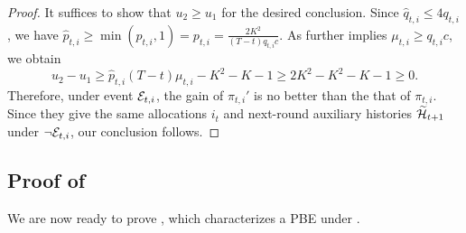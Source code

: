 \begin{proof}
It suffices to show that $u_2\geq u_1$ for the desired conclusion.
Since $\hat q_{t,i}\leq 4q_{t,i}$, we have $\hat p_{t,i} \geq \min(p_{t,i},1)=p_{t,i}=\frac{2K^2}{(T-t)q_{t,i} c}$. As  further implies $\mu_{t,i}\geq q_{t,i} c$, we obtain
\begin{equation*}
    u_2-u_1 \geq \hat p_{t,i}(T-t)\mu_{t,i} - K^2 - K - 1 \geq 2K^2 - K^2-K-1 \geq 0.
\end{equation*}
Therefore, under event $\mathcal{E}_{t,i}$, the gain of $\pi_{t,i}'$ is no better than the that of $\pi_{t,i}$. Since they give the same allocations $i_t$ and next-round auxiliary histories $\widetilde {\mathcal{H}}_{t+1}$ under $\neg \mathcal{E}_{t,i}$, our conclusion follows.
\end{proof}

\subsection{Proof of }\label{sec:equivalence of PBE formal}

We are now ready to prove , which characterizes a PBE under \mechname.

